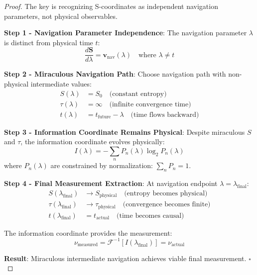 \documentclass[12pt,a4paper]{article}
\begin{document}
\begin{proof}
The key is recognizing S-coordinates as independent navigation parameters, not physical observables.

\textbf{Step 1 - Navigation Parameter Independence}:
The navigation parameter $\lambda$ is distinct from physical time $t$:
\begin{equation}
\frac{d\mathbf{S}}{d\lambda} = \mathbf{v}_{\text{nav}}(\lambda) \quad \text{where } \lambda \neq t
\end{equation}

\textbf{Step 2 - Miraculous Navigation Path}:
Choose navigation path with non-physical intermediate values:
\begin{align}
S(\lambda) &= S_0 \quad \text{(constant entropy)} \\
\tau(\lambda) &= \infty \quad \text{(infinite convergence time)} \\
t(\lambda) &= t_{\text{future}} - \lambda \quad \text{(time flows backward)}
\end{align}

\textbf{Step 3 - Information Coordinate Remains Physical}:
Despite miraculous $S$ and $\tau$, the information coordinate evolves physically:
\begin{equation}
I(\lambda) = -\sum_{n} P_n(\lambda) \log_2 P_n(\lambda)
\end{equation}
where $P_n(\lambda)$ are constrained by normalization: $\sum_n P_n = 1$.

\textbf{Step 4 - Final Measurement Extraction}:
At navigation endpoint $\lambda = \lambda_{\text{final}}$:
\begin{align}
S(\lambda_{\text{final}}) &\to S_{\text{physical}} \quad \text{(entropy becomes physical)} \\
\tau(\lambda_{\text{final}}) &\to \tau_{\text{physical}} \quad \text{(convergence becomes finite)} \\
t(\lambda_{\text{final}}) &= t_{\text{actual}} \quad \text{(time becomes causal)}
\end{align}

The information coordinate provides the measurement:
\begin{equation}
\nu_{\text{measured}} = \mathcal{F}^{-1}[I(\lambda_{\text{final}})] = \nu_{\text{actual}}
\end{equation}

\textbf{Result}: Miraculous intermediate navigation achieves viable final measurement. $\square$
\end{proof}
\end{document}
